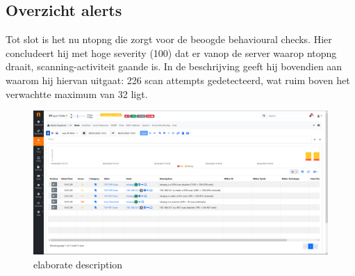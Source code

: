 \subsection{Overzicht alerts}
Tot slot is het nu ntopng die zorgt voor de beoogde behavioural checks. Hier concludeert hij met hoge severity (100) dat er vanop de server waarop ntopng draait, scanning-activiteit gaande is. In de beschrijving geeft hij bovendien aan waarom hij hiervan uitgaat: 226 scan attempts gedetecteerd, wat ruim boven het verwachtte maximum van 32 ligt.

\begin{figure}[htb]
    \includegraphics[width=\textwidth]{graphics/nmap_scan.PNG}
    \caption[ntopng scan alerts]{elaborate description}
    \label{fig:ntopngAlerts}
\end{figure}